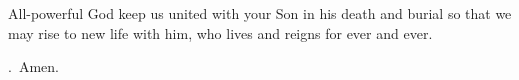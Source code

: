 \lettrine[loversize=0.15,lines=2]{A}{}ll-powerful God
keep us united with your Son
in his death and burial
so that we may rise to new life with him,
who lives and reigns for ever and ever.
\par \Rbar.~Amen.
